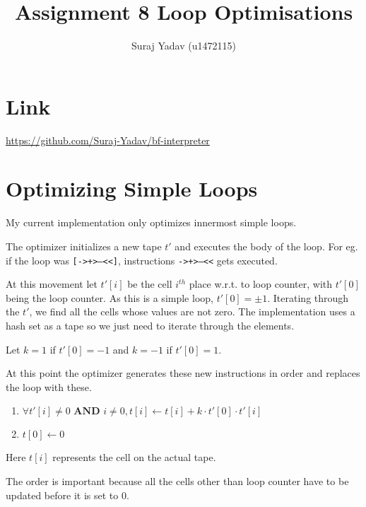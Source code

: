 \documentclass[11pt,answers]{exam}
\title{Assignment 8 Loop Optimisations}
\author{Suraj Yadav (u1472115)}
\begin{document}
\maketitle
\section{Link}
\url{https://github.com/Suraj-Yadav/bf-interpreter}
\section{Optimizing Simple Loops}
My current implementation only optimizes innermost simple loops.

The optimizer initializes a new tape $t'$ and executes the body of the loop. For eg. if the loop was \texttt{[->+>---<<]}, instructions \texttt{->+>---<<} gets executed.

At this movement let $t'[i]$ be the cell $i^{th}$ place w.r.t. to loop counter, with $t'[0]$ being the loop counter. As this is a simple loop, $t'[0] = \pm1$. Iterating through the $t'$, we find all the cells whose values are not zero. The implementation uses a hash set as a tape so we just need to iterate through the elements.

Let $k = 1$ if $t'[0] = -1$ and $k = -1$ if $t'[0] = 1$.

At this point the optimizer generates these new instructions in order and replaces the loop with these.
\begin{enumerate}
	\item $\forall t'[i]\ne0 \textbf{ AND } i\ne0, t[i] \gets t[i] + k \cdot t'[0] \cdot t'[i]$
	\item $t[0] \gets 0$
\end{enumerate}
Here $t[i]$ represents the cell on the actual tape.

The order is important because all the cells other than loop counter have to be updated before it is set to 0.
\end{document}
